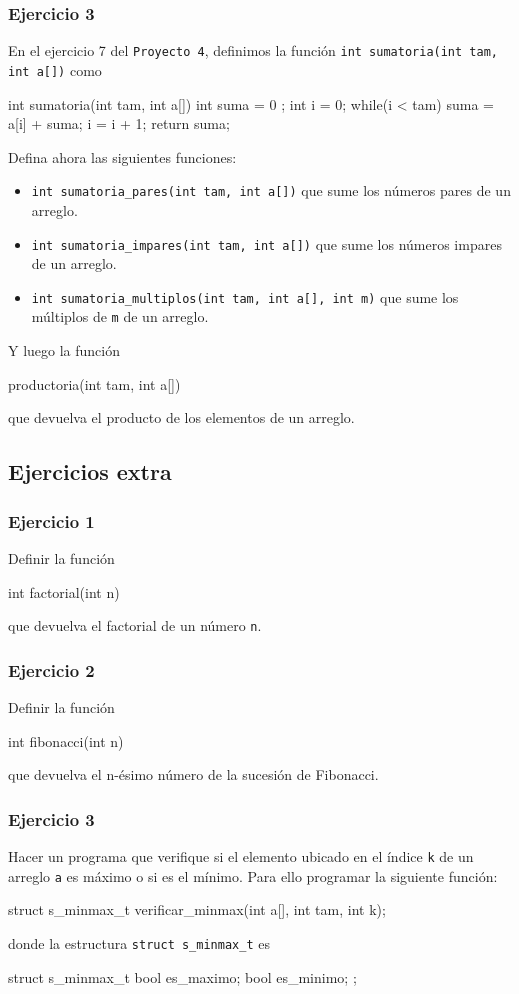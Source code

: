 \documentclass{article}
\begin{document}
\newpage
\subsubsection{Ejercicio 3}
En el ejercicio 7 del \texttt{Proyecto 4}, definimos la función \texttt{int sumatoria(int tam, int a[])} como
\begin{c_code}
int sumatoria(int tam, int a[]){
    int suma = 0 ;
    int i = 0;
    while(i < tam){
    suma = a[i] + suma;
    i = i + 1;
  }
  return suma;
}
\end{c_code}
Defina ahora las siguientes funciones:
\begin{itemize}
    \item \texttt{int sumatoria\_pares(int tam, int a[])} que sume los números pares de un arreglo.
    \item \texttt{int sumatoria\_impares(int tam, int a[])} que sume los números impares de un arreglo.
    \item \texttt{int sumatoria\_multiplos(int tam, int a[], int m)} que sume los múltiplos de \texttt{m} de un arreglo.
\end{itemize}
Y luego la función
\begin{c_code}
    productoria(int tam, int a[])
\end{c_code}
que devuelva el producto de los elementos de un arreglo.

\subsection{Ejercicios extra}

\subsubsection{Ejercicio 1}
Definir la función
\begin{c_code}
    int factorial(int n)
\end{c_code}
que devuelva el factorial de un número \texttt{n}.

\subsubsection{Ejercicio 2}
Definir la función
\begin{c_code}
    int fibonacci(int n)
\end{c_code}
que devuelva el n-ésimo número de la sucesión de Fibonacci.

\subsubsection{Ejercicio 3}
Hacer un programa que verifique si el elemento ubicado en el índice \texttt{k} de un arreglo \texttt{a} es máximo o si es el mínimo. Para ello programar la siguiente función:
\begin{c_code}
struct s_minmax_t verificar_minmax(int a[], int tam, int k);
\end{c_code}
donde la estructura \texttt{struct s\_minmax\_t} es
\begin{c_code}
struct s_minmax_t {
    bool es_maximo;
    bool es_minimo;
};
\end{c_code}
\end{document}
